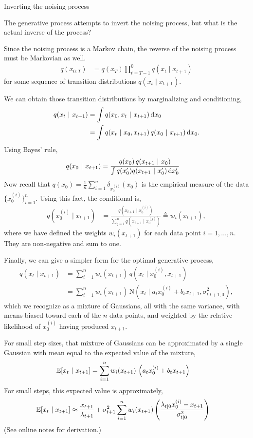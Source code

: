 \documentclass[aspectratio=169]{beamer}
\begin{document}
\begin{frame}[t,allowframebreaks]{Inverting the noising
process}\label{inverting-the-noising-process}

The generative process attempts to invert the noising process, but what
is the actual inverse of the process? 

Since the noising process is a
Markov chain, the reverse of the noising process must be Markovian as
well. 
\begin{align*}
q(x_{0:T}) &= q(x_T) \prod_{t=T-1}^0 q(x_t \mid x_{t+1})
\end{align*} 
for some sequence of transition distributions
\(q(x_t \mid x_{t+1})\). 

We can obtain those transition distributions by
marginalizing and conditioning, 
\begin{align*}
q(x_t ~\vert~ x_{t+1}) 
&= \int q(x_0, x_t ~\vert~ x_{t+1}) \mathop{}\!\mathrm{d} x_0 \\
&= \int q(x_t ~\vert~ x_0, x_{t+1}) \, q(x_0 ~\vert~ x_{t+1}) \mathop{}\!\mathrm{d} x_0.
\end{align*} 
Using Bayes' rule, 
\begin{align*}
q(x_0 ~\vert~ x_{t+1}) 
&= \frac{q(x_0) \, q(x_{t+1} ~\vert~ x_0)}{\int q(x_0') q(x_{t+1} ~\vert~ x_0') \mathop{}\!\mathrm{d} x_0'} 
\end{align*} 
Now recall that
\(q(x_0) = \frac{1}{n} \sum_{i=1}^n \delta_{x_0^{(i)}}(x_0)\) is the
empirical measure of the data \(\{x_0^{(i)}\}_{i=1}^n\). Using this
fact, the conditional is, 
\begin{align*}
q(x_0^{(i)} \mid x_{t+1}) 
&= \frac{q(x_{t+1} \mid x_0^{(i)})}{\sum_{j=1}^n q(x_{t+1} \mid x_0^{(j)})} 
\triangleq w_i(x_{t+1}),
\end{align*} 
where we have defined the weights \(w_i(x_{t+1})\) for each
data point \(i=1,\ldots,n\). They are non-negative and sum to one.

Finally, we can give a simpler form for the optimal generative process,
\begin{align*}
q(x_t \mid x_{t+1}) 
&= \sum_{i=1}^n w_i(x_{t+1}) \, q(x_t \mid x_0^{(i)}, x_{t+1}) \\
&= \sum_{i=1}^n w_i(x_{t+1}) \, \mathrm{N}(x_t \mid a_t x_0^{(i)} + b_t x_{t+1}, \sigma_{t|t+1,0}^2),
\end{align*} 
which we recognize as a mixture of Gaussians, all with the
same variance, with means biased toward each of the \(n\) data points,
and weighted by the relative likelihood of \(x_0^{(i)}\) having produced
\(x_{t+1}\).

For small step sizes, that mixture of Gaussians can be approximated by a
single Gaussian with mean equal to the expected value of the mixture,
\begin{align*}
\mathbb{E}[x_t ~\vert~ x_{t+1}]
&= \sum_{i=1}^n w_i(x_{t+1}) \, \left(a_t x_0^{(i)} + b_t x_{t+1} \right) 
\end{align*} 
For small steps, this expected value is approximately,
\begin{align*}
\mathbb{E}[x_t ~\vert~ x_{t+1}]
&\approx \frac{x_{t+1}}{\lambda_{t+1}} + \sigma_{t+1}^2 \sum_{i=1}^n w_i(x_{t+1}) \left(\frac{ \lambda_{t|0} x_0^{(i)} - x_{t+1}}{\sigma_{t|0}^2} \right)
\end{align*}
(See online notes for derivation.)


\end{frame}
\end{document}

